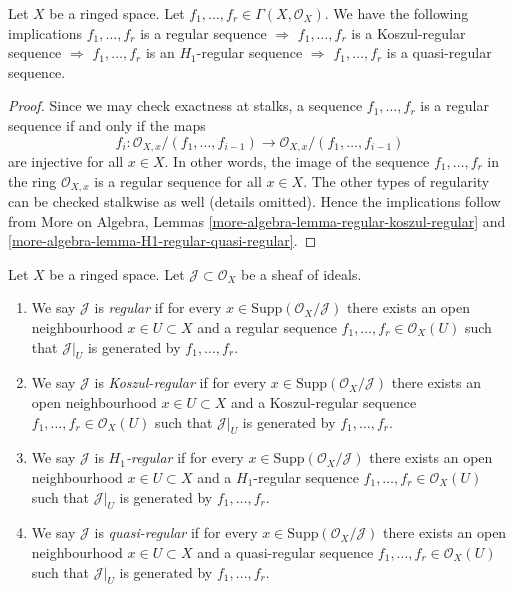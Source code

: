 \begin{lemma}
\label{lemma-types-regular-sequences-implications}
Let $X$ be a ringed space.
Let $f_1, \ldots, f_r \in \Gamma(X, \mathcal{O}_X)$.
We have the following implications
$f_1, \ldots, f_r$ is a regular sequence $\Rightarrow$
$f_1, \ldots, f_r$ is a Koszul-regular sequence $\Rightarrow$
$f_1, \ldots, f_r$ is an $H_1$-regular sequence $\Rightarrow$
$f_1, \ldots, f_r$ is a quasi-regular sequence.
\end{lemma}

\begin{proof}
Since we may check exactness at stalks, a
sequence $f_1, \ldots, f_r$ is a regular sequence if and only
if the maps
$$
f_i :
\mathcal{O}_{X, x}/(f_1, \ldots, f_{i - 1})
\longrightarrow
\mathcal{O}_{X, x}/(f_1, \ldots, f_{i - 1})
$$
are injective for all $x \in X$. In other words, the image of the sequence
$f_1, \ldots, f_r$ in the ring $\mathcal{O}_{X, x}$ is a
regular sequence for all $x \in X$. The other types of regularity
can be checked stalkwise as well (details omitted).
Hence the implications follow from
More on Algebra, Lemmas
\ref{more-algebra-lemma-regular-koszul-regular} and
\ref{more-algebra-lemma-H1-regular-quasi-regular}.
\end{proof}

\begin{definition}
\label{definition-regular-ideal-sheaf}
Let $X$ be a ringed space. Let $\mathcal{J} \subset \mathcal{O}_X$
be a sheaf of ideals.
\begin{enumerate}
\item We say $\mathcal{J}$ is {\it regular} if for every
$x \in \text{Supp}(\mathcal{O}_X/\mathcal{J})$ there exists an open
neighbourhood $x \in U \subset X$ and a regular sequence
$f_1, \ldots, f_r \in \mathcal{O}_X(U)$ such that $\mathcal{J}|_U$
is generated by $f_1, \ldots, f_r$.
\item We say $\mathcal{J}$ is {\it Koszul-regular} if for every
$x \in \text{Supp}(\mathcal{O}_X/\mathcal{J})$ there exists an open
neighbourhood $x \in U \subset X$ and a Koszul-regular sequence
$f_1, \ldots, f_r \in \mathcal{O}_X(U)$ such that $\mathcal{J}|_U$
is generated by $f_1, \ldots, f_r$.
\item We say $\mathcal{J}$ is {\it $H_1$-regular} if for every
$x \in \text{Supp}(\mathcal{O}_X/\mathcal{J})$ there exists an open
neighbourhood $x \in U \subset X$ and a $H_1$-regular sequence
$f_1, \ldots, f_r \in \mathcal{O}_X(U)$ such that $\mathcal{J}|_U$
is generated by $f_1, \ldots, f_r$.
\item We say $\mathcal{J}$ is {\it quasi-regular} if for every
$x \in \text{Supp}(\mathcal{O}_X/\mathcal{J})$ there exists an open
neighbourhood $x \in U \subset X$ and a quasi-regular sequence
$f_1, \ldots, f_r \in \mathcal{O}_X(U)$ such that $\mathcal{J}|_U$
is generated by $f_1, \ldots, f_r$.
\end{enumerate}
\end{definition}

